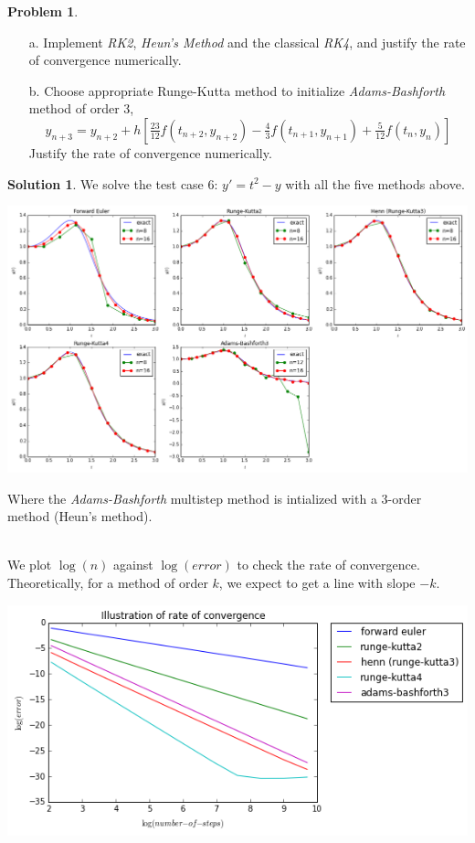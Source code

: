 \documentclass[a4paper, 10pt]{article}
\theoremstyle{definition}
\newtheorem{problem}{Problem}
\theoremstyle{hSol}
\newtheorem*{solution}{Solution}
\begin{document}
\begin{problem}
\begin{itemize}
  \item[a.] Implement \emph{RK2}, \emph{Heun's Method} and the classical \emph{RK4}, and justify the rate of convergence numerically.
  \item[b.] Choose appropriate Runge-Kutta method to initialize \emph{Adams-Bashforth} method of order 3,
  $$
  y_{n+3} = y_{n+2} + h [\tfrac{23}{12}f(t_{n+2}, y_{n+2}) - \tfrac{4}{3} f(t_{n+1}, y_{n+1}) + \tfrac{5}{12}f(t_n, y_n)]
  $$
  Justify the rate of convergence numerically.
\end{itemize}
\end{problem}
\begin{solution} We solve the test case 6: $y'=t^2 - y$ with all the five methods above.

\begin{center}
\includegraphics[scale=0.4]{hw2_p1.png}
\end{center}
Where the \emph{Adams-Bashforth} multistep method is intialized with a 3-order method (Heun's method). 

~\\
We plot $\log(n)$ against $\log(error)$ to check the rate of convergence. Theoretically, for a method of order $k$, we expect to get a line with slope $-k$.

\begin{center}
\includegraphics[scale=0.7]{hw2_p2.png}
\end{center}


\end{solution}
\end{document}
